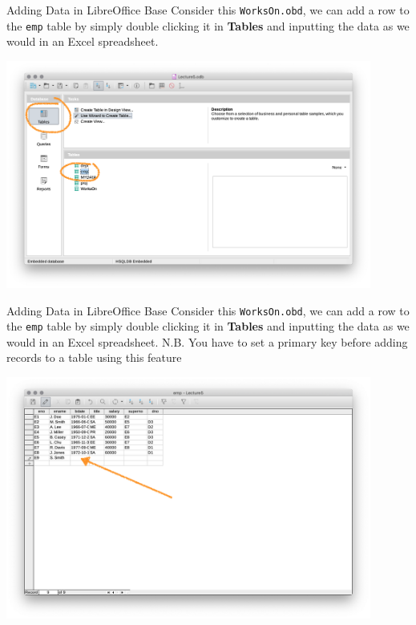 \documentclass[xcolor=svgnames]{beamer}
\theoremstyle{example}
\begin{document}
\begin{frame}{Adding Data in LibreOffice Base}
Consider this {\tt WorksOn.obd}, we can add a row to the {\tt emp} table by simply double clicking it in {\bf Tables} and inputting the data as we would in an Excel spreadsheet. 
\begin{center}
\includegraphics[width=0.9\textwidth]{img/empTables}
\end{center}
\end{frame}

\begin{frame}{Adding Data in LibreOffice Base}
Consider this {\tt WorksOn.obd}, we can add a row to the {\tt emp} table by simply double clicking it in {\bf Tables} and inputting the data as we would in an Excel spreadsheet.  N.B. You have to set a primary key before adding records to a table using this feature %
\begin{center}
\includegraphics[width=0.9\textwidth]{img/inputEmp}
\end{center}
\end{frame}
\end{document}
